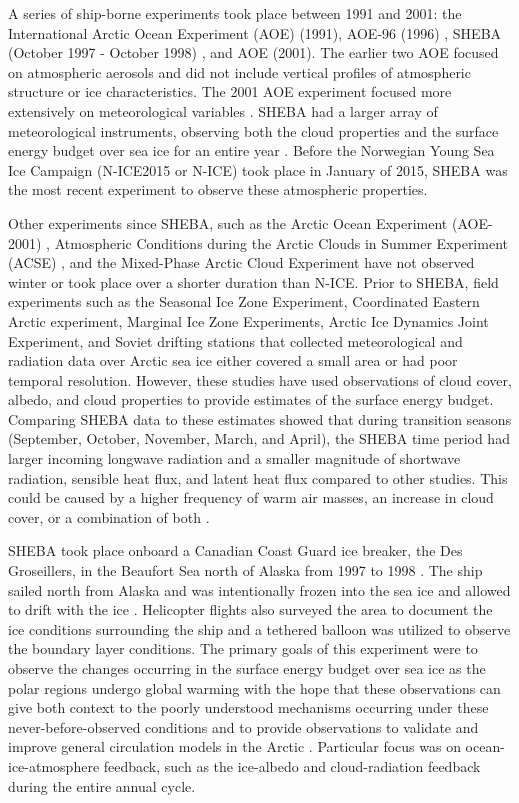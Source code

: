 A series of ship-borne experiments took place between 1991 and 2001: the International Arctic Ocean Experiment (AOE) (1991), AOE-96 (1996) \citep{tjernstrom:2004}, SHEBA (October 1997 - October 1998) \citep{uttal:2002}, and AOE (2001). The earlier two AOE focused on atmospheric aerosols and did not include vertical profiles of atmospheric structure or ice characteristics. The 2001 AOE experiment focused more extensively on meteorological variables \citep{tjernstrom:2004}. SHEBA had a larger array of meteorological instruments, observing both the cloud properties and the surface energy budget over sea ice for an entire year \citep{uttal:2002}. Before the Norwegian Young Sea Ice Campaign (N-ICE2015 or N-ICE) took place in January of 2015, SHEBA was the most recent experiment to observe these atmospheric properties. 

Other experiments since SHEBA, such as the Arctic Ocean Experiment (AOE-2001) \citep{tjernstrom:2005}, Atmospheric Conditions during the Arctic Clouds in Summer Experiment (ACSE) \citep{sotiropoulou:2016}, and the Mixed-Phase Arctic Cloud Experiment \citep{verlinde:2007} have not observed winter or took place over a shorter duration than N-ICE. Prior to SHEBA, field experiments such as the Seasonal Ice Zone Experiment, Coordinated Eastern Arctic experiment, Marginal Ice Zone Experiments, Arctic Ice Dynamics Joint Experiment, and Soviet drifting stations \citep{vihma:2005, kahl:1999} that collected meteorological and radiation data over Arctic sea ice either covered a small area or had poor temporal resolution. However, these studies have used observations of cloud cover, albedo, and cloud properties to provide estimates of the surface energy budget. Comparing SHEBA data to these estimates showed that during transition seasons (September, October, November, March, and April), the SHEBA time period had larger incoming longwave radiation and a smaller magnitude of shortwave radiation, sensible heat flux, and latent heat flux compared to other studies. This could be caused by a higher frequency of warm air masses, an increase in cloud cover, or a combination of both \citep{persson:2002}. 

SHEBA took place onboard a Canadian Coast Guard ice breaker, the Des Groseillers, in the Beaufort Sea north of Alaska from 1997 to 1998 \citep{uttal:2002, shupe:2004}. The ship sailed north from Alaska and was intentionally frozen into the sea ice and allowed to drift with the ice \citep{uttal:2002}. Helicopter flights also surveyed the area to document the ice conditions surrounding the ship and a tethered balloon was utilized to observe the boundary layer conditions. The primary goals of this experiment were to observe the changes occurring in the surface energy budget over sea ice as the polar regions undergo global warming with the hope that these observations can give both context to the poorly understood mechanisms occurring under these never-before-observed conditions and to provide observations to validate and improve general circulation models in the Arctic \citep{uttal:2002}. Particular focus was on ocean-ice-atmosphere feedback, such as the ice-albedo and cloud-radiation feedback during the entire annual cycle. 

